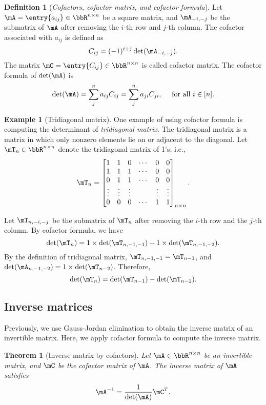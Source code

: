 \documentclass[11pt]{article}
\theoremstyle{plain}
\newtheorem{thm}{Theorem}[section]
\theoremstyle{definition}
\newtheorem{defn}{Definition}
\newtheorem{example}{Example}
\begin{document}
\begin{defn}[\textit{Cofactors, cofactor matrix, and cofactor formula}]
	Let $\mA=  \entry{a_{ij}} \in \bbR^{n \times n}$ be a square matrix, and $\mA_{-i,-j}$ be the submatrix of $\mA$ after removing the $i$-th row and $j$-th column. The cofactor associated with $a_{ij}$ is defined as \[C_{ij} = (-1)^{i+j}\det(\mA_{-i,-j}).\]
	The matrix $\mC = \entry{C_{ij}} \in \bbR^{n \times n}$ is called cofactor matrix.  The cofactor formula of $\det(\mA)$ is
	\[ \det(\mA) = \sum_{j}^n a_{ij} C_{ij} = \sum_{j}^n a_{ji} C_{ji} ,\quad \text{ for all } i \in [n].  \]
\end{defn}

\begin{example}[Tridiagonal matrix]
	One example of using cofactor formula is computing the determinant of \textit{tridiagonal matrix}. The tridiagonal matrix is a matrix in which only nonzero elements lie on or adjacent to the diagonal. Let $\mT_n \in \bbR^{n \times n}$ denote the tridiagonal matrix of 1's; i.e.,
\begin{align}
	\mT_n = \begin{bmatrix}
		1 &1&0 &\cdots & 0 &0\\
		1&1&1&\cdots &0&0\\
		0&1&1&\cdots &0&0\\
		\vdots &\vdots &\vdots &&\vdots &\vdots \\
		0&0&0&\cdots&1&1
	\end{bmatrix}_{n \times n}.
\end{align} 

Let $\mT_{n, -i,-j}$ be the submatrix of  $\mT_n$ after removing the $i$-th row and the $j$-th column.   By cofactor formula, we have
\[  \det(\mT_n) = 1 \times \det(\mT_{n, -1,-1}) - 1 \times \det(\mT_{n,-1,-2}). \]
By the definition of tridiagonal matrix, $\mT_{n,-1,-1} = \mT_{n-1}$, and $\det( \mA_{n,-1,-2}) = 1 \times \det(\mT_{n-2}) $. Therefore, 
\[ \det(\mT_n) = \det(\mT_{n-1}) - \det(\mT_{n-2}).  \] 
\end{example}

\subsection{Inverse matrices}
Previously, we use Gauss-Jordan elimination to obtain the inverse matrix of an invertible matrix. Here, we apply cofactor formula to compute the inverse matrix.

\begin{thm}[Inverse matrix by cofactors]\label{thm:inver}
Let $\mA \in \bbR^{n \times n}$ be an invertible matrix, and $\mC$ be the cofactor matrix of $\mA$. The inverse matrix of $\mA$ satisfies
\[  \mA^{-1} = \frac{1}{\det(\mA)} \mC^T. \]	
\end{thm}
\end{document}
